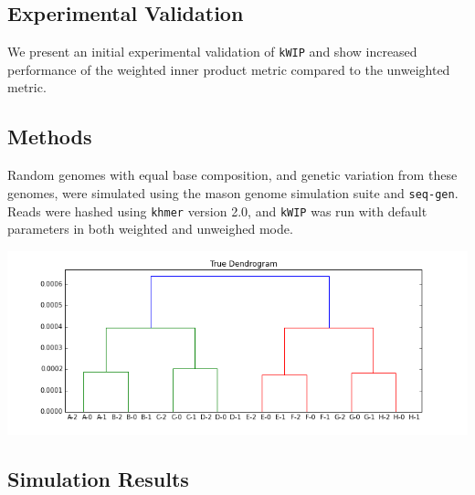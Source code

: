 \documentclass[a0,portrait]{a0poster}
\begin{document}
\begin{multicols}{2}

\section*{Experimental Validation}

We present an initial experimental validation of \texttt{kWIP} and show
increased performance of the weighted inner product metric compared to the
unweighted metric.

\subsection*{Methods}

Random genomes with equal base composition, and genetic variation from these
genomes, were simulated using the mason genome simulation suite
\cite{holtgrewe_mason_2010} and \texttt{seq-gen}\cite{rambaut_seq-gen:_1997}.
Reads were hashed using \texttt{khmer} version 2.0, and \texttt{kWIP} was run
with default parameters in both weighted and unweighed mode.

\begin{center}
  \vspace{1cm}
  \includegraphics[width=25cm]{true-dendro.png}
\end{center}

\subsection*{Simulation Results}


\end{multicols}
\end{document}

